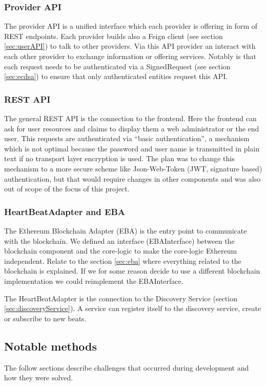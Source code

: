 \subsubsection{Provider API}
\label{sec:providerAPI}
The provider API is a unified interface which each provider is offering in form of REST endpoints. Each provider builds also a Feign client (see section \ref{sec:userAPI}) to talk to other providers.  Via this API provider an interact with each other provider to exchange information or offering services. Notably is that each request needs to be authenticated via a SignedRequest (see section \ref{sec:ecdsa}) to ensure that only authenticated entities request this API. 

\subsubsection{REST API}
The general REST API is the connection to the frontend. Here the frontend can ask for user resources and claims to display them a web administrator or the end user. This requests are authenticated via “basic authentication”, a mechanism which is not optimal because the password and user name is transmitted in plain text if no transport layer encryption is used. The plan was to change this mechanism to a more secure scheme like Json-Web-Token (JWT, signature based) authentication, but that would require changes in other components and was also out of scope of the focus of this project. 

\subsubsection{HeartBeatAdapter and EBA}
The Ethereum Blockchain Adapter (EBA) is the entry point to communicate with the blockchain. We defined an interface (EBAInterface) between the blockchain component and the core-logic to make the core-logic Ethereum independent. Relate to the section \ref{sec:eba} where everything related to the blockchain is explained. If we for some reason decide to use a different blockchain implementation we could reimplement the EBAInterface.

The HeartBeatAdapter is the connection to the Discovery Service (section \ref{sec:discoveryService}). A service can register itself to the discovery service, create or subscribe to new beats.

\subsection{Notable methods}
The follow sections describe challenges that occurred during development and how they were solved. 

